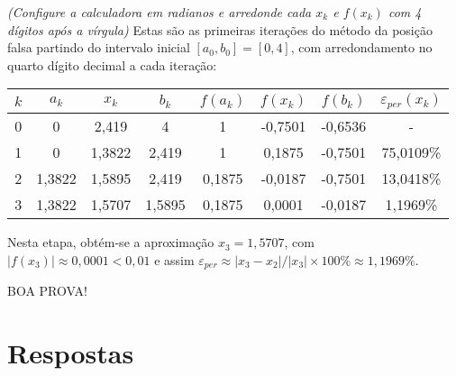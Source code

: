 \documentclass[12pt,a4paper]{article}
\begin{document}
\begin{ExerciseList}
\textit{(Configure a calculadora em radianos e arredonde cada $x_k$ e $f(x_k)$ com 4 dígitos após a vírgula)}
\Answer
Estas são as primeiras iterações do método da posição falsa partindo do intervalo inicial $[a_0, b_0] = [0, 4]$, com arredondamento no quarto dígito decimal a cada iteração:
\begin{center}
\begin{tabular}{cccccccc}
\hline
$k$ & $a_k$ & $x_k$ & $b_k$ & $f(a_k)$ & $f(x_k)$ & $f(b_k)$  & $\varepsilon_{per}(x_k)$\\
\hline
0 & 0 & 2,419 & 4 & 1 & -0,7501 & -0,6536 & - \\
1 & 0 & 1,3822 & 2,419 & 1 & 0,1875 & -0,7501 & 75,0109\% \\
2 & 1,3822 & 1,5895 & 2,419 & 0,1875 & -0,0187 & -0,7501 & 13,0418\% \\
3 & 1,3822 & 1,5707 & 1,5895 & 0,1875 & 0,0001 & -0,0187 & 1,1969\% \\
\hline
\end{tabular}
\end{center}
\medskip
Nesta etapa, obtém-se a aproximação $x_3 = 1,5707$, com $|f(x_3)| \approx 0,0001 < 0,01$ e assim $\varepsilon_{per} \approx |x_3-x_2|/|x_3|\times 100\% \approx 1,1969\%$.
\end{ExerciseList}

\vfill
\begin{center}
BOA PROVA!
\end{center}

\newpage
\restoregeometry
\section*{Respostas}
\shipoutAnswer
\end{document}
